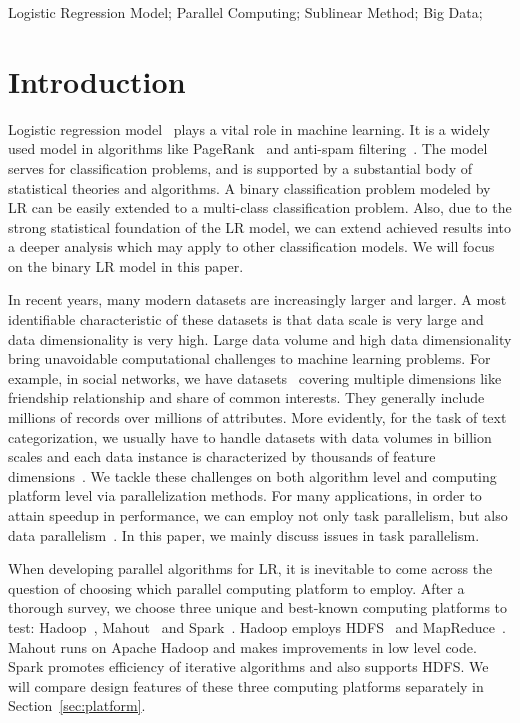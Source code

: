 \documentclass[10pt, conference, compsocconf]{IEEEtran}
\begin{document}
\begin{IEEEkeywords}
Logistic Regression Model; Parallel Computing; Sublinear Method; Big Data;
\end{IEEEkeywords}

\section{Introduction} \label{sec:int}
Logistic regression model~\cite{HastieBook:SL} plays a vital role in machine learning.
It is a widely used model in algorithms like PageRank~\cite{page1999pagerank} and anti-spam filtering~\cite{androutsopoulos2000evaluation}.
The model serves for classification problems, and is supported by a substantial body of statistical theories and algorithms.
A binary classification problem modeled by LR can be easily extended to a multi-class classification problem.
Also, due to the strong statistical foundation of the LR model, we can extend achieved results into a deeper analysis which may apply to other classification models. We will focus on the binary LR model in this paper.

In recent years, many modern datasets are increasingly larger and larger.
A most identifiable characteristic of these datasets is that data scale is very large and data dimensionality is very high.
Large data volume and high data dimensionality bring unavoidable computational challenges to machine learning problems.
For example, in social networks, we have datasets~\cite{lewis2008tastes} covering multiple dimensions like friendship relationship and share of common interests. They generally include millions of records over millions of attributes. More evidently, for the task of text categorization, we usually have to handle datasets with data volumes in billion scales and each data instance is characterized by thousands of feature dimensions~\cite{lewis2004rcv1}.
We tackle these challenges on both algorithm level and computing platform level via parallelization methods.
For many applications, in order to attain speedup in performance, we can employ not only task parallelism, but also data parallelism~\cite{subhlok1993exploiting}.
In this paper, we mainly discuss issues in task parallelism.

When developing parallel algorithms for LR, it is inevitable to come across the question of choosing which parallel computing platform to employ.
After a thorough survey, we choose three unique and best-known computing platforms to test: Hadoop~\cite{white2012hadoop}, Mahout~\cite{mahoutscalable} and Spark~\cite{zaharia2010spark}.
Hadoop employs HDFS~\cite{borthakur2008hdfs} and MapReduce~\cite{dean2008mapreduce}.
Mahout runs on Apache Hadoop and makes improvements in low level code.
Spark promotes efficiency of iterative algorithms and also supports HDFS.
We will compare design features of these three computing platforms separately in Section~\ref{sec:platform}.
\end{document}
